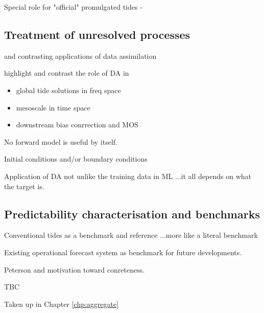 Special role for "official" promulgated tides - 


\subsection{Treatment of unresolved processes}

and contrasting applications of data assimilation

highlight and contrast the role of DA in 
\begin{itemize}
    \item global tide solutions in freq space
    \item mesoscale in time space
    \item downstream bias conrrection and MOS
\end{itemize}

No forward model is useful by itself.

Initial conditions and/or boundary conditions 

Application of DA not unlike the training data in ML ...it all depends on what the target is.



\subsection{Predictability characterisation and benchmarks}

Conventional tides as a benchmark and reference ...more like a literal benchmark


Existing operational forecast system as benchmark for future developments.


Peterson and motivation toward conreteness.


TBC

Taken up in Chapter \ref{chp:aggregate}




